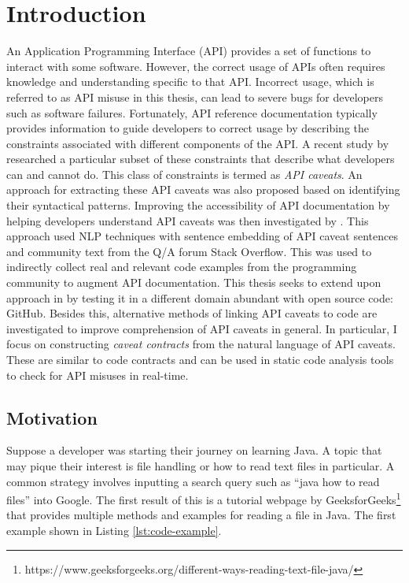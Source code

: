 \chapter{Introduction}
\label{cha:intro}
An Application Programming Interface (API) provides a set of functions to interact with some software. However, the correct usage of APIs often requires knowledge and understanding specific to that API. Incorrect usage, which is referred to as API misuse in this thesis, can lead to severe bugs for developers such as software failures. Fortunately, API reference documentation typically provides information to guide developers to correct usage by describing the constraints associated with different components of the API. A recent study by \cite{caveat-knowledge-graph} researched a particular subset of these constraints that describe what developers can and cannot do. This class of constraints is termed as \textit{API caveats}. An approach for extracting these API caveats was also proposed based on identifying their syntactical patterns. Improving the accessibility of API documentation by helping developers understand API caveats was then investigated by \cite{jiamou}. This approach used NLP techniques with sentence embedding of API caveat sentences and community text from the Q/A forum Stack Overflow. This was used to indirectly collect real and relevant code examples from the programming community to augment API documentation. This thesis seeks to extend upon approach in \cite{jiamou} by testing it in a different domain abundant with open source code: GitHub. Besides this, alternative methods of linking API caveats to code are investigated to improve comprehension of API caveats in general. In particular, I focus on constructing \textit{caveat contracts} from the natural language of API caveats. These are similar to code contracts and can be used in static code analysis tools to check for API misuses in real-time. \\

\section{Motivation}
Suppose a developer was starting their journey on learning Java. A topic that may pique their interest is file handling or how to read text files in particular. A common strategy involves inputting a search query such as ``java how to read files'' into Google. The first result of this is a tutorial webpage by GeeksforGeeks\footnote{https://www.geeksforgeeks.org/different-ways-reading-text-file-java/} that provides multiple methods and examples for reading a file in Java. The first example shown in Listing \ref{lst:code-example}.

